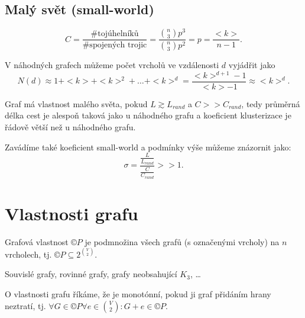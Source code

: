 \documentclass[12pt]{article}					%
\begin{document}
        \subsection{Malý svět (small-world)}
            \begin{definice}
                $$ C = \frac{\text{\#tojúhelníků}}{\text{\#spojených trojic}} = \frac{\binom{n}{3}p^3}{\binom{n}{3}p^2} = p = \frac{<k>}{n-1}. $$ 
            \end{definice}

            \begin{poznamka}
                V náhodných grafech můžeme počet vrcholů ve vzdálenosti $d$ vyjádřit jako
                $$ N(d) \approx 1 + <k> + <k>^2 + … + <k>^d = \frac{<k>^{d+1} - 1}{<k> - 1} \approx <k>^d. $$ 
            \end{poznamka}

            \begin{definice}
                Graf má vlastnost malého světa, pokud $L \gtrsim L_{rand}$ a $C >> C_{rand}$, tedy průměrná délka cest je alespoň taková jako u náhodného grafu a koeficient klusterizace je řádově větší než u náhodného grafu.

                Zavádíme také koeficient small-world a podmínky výše můžeme znázornit jako:
                $$ \sigma = \frac{\frac{L}{L_{rand}}}{\frac{C}{C_{rand}}} >> 1. $$ 
            \end{definice}

\section{Vlastnosti grafu}
    \begin{definice}
        Grafová vlastnost $©P$ je podmnožina všech grafů (s označenými vrcholy) na $n$ vrcholech, tj. $©P \subseteq 2^{\binom{V}{2}}$.

        \begin{prikladyin}
            Souvislé grafy, rovinné grafy, grafy neobsahující $K_3$, …
        \end{prikladyin}
    \end{definice}

    \begin{definice}
        O vlastnosti grafu říkáme, že je monotónní, pokud ji graf přidáním hrany neztratí, tj. $\forall G \in ©P \forall e \in \binom{V}{2}: G + e \in ©P$.
    \end{definice}
\end{document}
